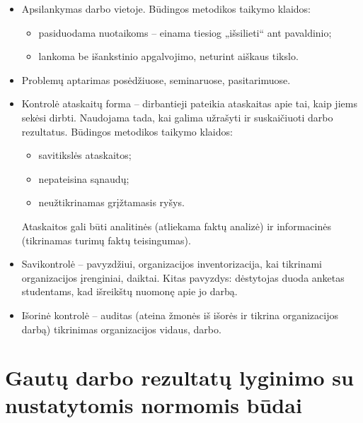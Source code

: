 \begin{itemize}
  \item Apsilankymas darbo vietoje. Būdingos metodikos taikymo
    klaidos:
    \begin{itemize}
      \item pasiduodama nuotaikoms – einama tiesiog „išsilieti“ ant
        pavaldinio;
      \item lankoma be išankstinio apgalvojimo, neturint aiškaus
        tikslo.
    \end{itemize}
  \item Problemų aptarimas posėdžiuose, seminaruose, pasitarimuose.
  \item Kontrolė ataskaitų forma – dirbantieji pateikia ataskaitas
    apie tai, kaip jiems sekėsi dirbti. Naudojama tada, kai galima
    užrašyti ir suskaičiuoti darbo rezultatus. Būdingos metodikos
    taikymo klaidos:
    \begin{itemize}
      \item savitikslės ataskaitos;
      \item nepateisina sąnaudų;
      \item neužtikrinamas grįžtamasis ryšys.
    \end{itemize}
    Ataskaitos gali būti analitinės (atliekama faktų analizė) ir
    informacinės (tikrinamas turimų faktų teisingumas).
  \item Savikontrolė – pavyzdžiui, organizacijos inventorizacija, kai
    tikrinami organizacijos įrenginiai, daiktai. Kitas pavyzdys:
    dėstytojas duoda anketas studentams, kad išreikštų nuomonę apie
    jo darbą.
  \item Išorinė kontrolė – auditas (ateina žmonės iš išorės ir tikrina
    organizacijos darbą) tikrinimas organizacijos vidaus, darbo.
\end{itemize}

\section{Gautų darbo rezultatų lyginimo su nustatytomis normomis būdai}

